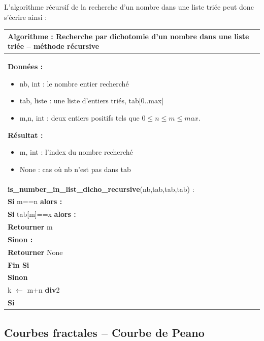 \documentclass[10pt,fleqn]{article} %
\newcommand{\bfsf}[1]{\small\textbf{\textsf{#1}}}%
\newcommand{\tsf}[1]{\small{\textsf{#1}}}
\begin{document}
L'algorithme récursif de la recherche d'un nombre dans une liste triée peut donc s'écrire ainsi :


\begin{center}
\begin{tabular}{p{}}
\hline
\textbf{Algorithme :} Recherche par dichotomie d'un nombre dans une liste triée -- méthode récursive\\
\hline
\textbf{Données :}
\begin{itemize}
\item \tsf{nb}, int : le nombre entier recherché 
\item \tsf{tab}, liste : une liste d'entiers triés, tab[0..max]
\item \tsf{m,n}, int : deux entiers positifs tels que $0\leq n\leq m \leq max$.
\end{itemize}
\textbf{Résultat :} 
\begin{itemize}
\item \tsf{m}, int : l'index du nombre recherché
\item \tsf{None} : cas où \tsf{nb} n'est pas dans \tsf{tab}
\end{itemize}
\\
\bfsf{is\_number\_in\_list\_dicho\_recursive}(\tsf{nb},\tsf{tab},\tsf{tab},\tsf{tab}) :\\
\hspace{.4cm} \bfsf{Si} m==n \bfsf{alors :}\\
\hspace{.8cm} \bfsf{Si} tab[m]==x \bfsf{alors :}\\
\hspace{1.2cm} \bfsf{Retourner} \tsf{m}\\
\hspace{.8cm} \bfsf{Sinon :}\\
\hspace{1.2cm} \bfsf{Retourner} \tsf{None}\\
\hspace{.8cm} \bfsf{Fin Si}\\
\hspace{.4cm} \bfsf{Sinon}\\
\hspace{.8cm} \tsf{k} $\leftarrow$ \tsf{m+n} \bfsf{div}2\\
\hspace{.8cm} \bfsf{Si} \\
\hline
\end{tabular}
\end{center}

\subsection{Courbes fractales -- Courbe de Peano}
\end{document}

